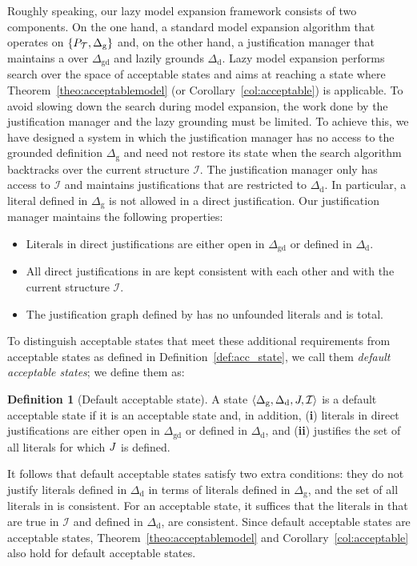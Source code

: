 \documentclass[11pt]{article}
\newcommand{\m}[1]{\ensuremath{#1}\xspace}
\newcommand{\I}{\m{\mathcal{I}}}
\newcommand{\theory}{\m{\mathcal{T}}}
\newcommand{\D}{\m{\Delta}}
\newcommand{\tuple}[1]{\m{\left \langle #1 \right \rangle }}
\theoremstyle{plain}
\theoremstyle{definition}
\newtheorem{definition}[thm]{Definition}
\theoremstyle{example_basic}
\theoremstyle{example_contd}
\theoremstyle{plain}
\newcommand{\Dg}{\ensuremath{\D_\text{g}}\xspace}
\newcommand{\Dd}{\ensuremath{\D_\text{d}}\xspace}
\newcommand{\Dgd}{\ensuremath{\D_\text{gd}}\xspace}
\newcommand{\pt}{\ensuremath{P_\text{\theory}}\xspace}
\newcommand{\tbf}[1]{\textbf{#1}}
\newcommand{\change}[1]{#1}
\begin{document}
Roughly speaking, our lazy model expansion framework consists of two components. On the one hand, a standard model expansion algorithm that operates on $\{\pt, \Dg\}$ and, on the other hand, a justification manager that maintains a \justification over \Dgd and lazily grounds \Dd. Lazy model expansion performs search over the space of acceptable states and aims at reaching a state where Theorem~\ref{theo:acceptablemodel} (or Corollary~\ref{col:acceptable}) is applicable. To avoid slowing down the search during model expansion, the work done by the justification manager and the lazy grounding must be limited. To achieve this, we have designed a system in which the justification manager has no access to the grounded definition \Dg and need not restore its state when the search algorithm backtracks over the current structure \I.  The justification manager only has access to \I and maintains justifications that are restricted to \Dd. In particular, a literal defined in \Dg is not allowed in a direct justification. Our justification manager maintains the following properties: 
\begin{itemize}
\item Literals in direct justifications are either open in \Dgd or defined in \Dd.
\item All direct justifications in \jgraph are kept consistent with each other and with the current structure \I.
\item The justification graph defined by \jgraph has no \change{unfounded literals} and is total.
\end{itemize}

To distinguish acceptable states that meet these additional
requirements from acceptable states as defined in
Definition~\ref{def:acc_state}, we call them 
\emph{default acceptable states}; we define them as:

\begin{definition}[Default acceptable state]\label{def:default_acc_state}
A state $\tuple{\Dg,\Dd,\jgraph,\I}$ is a default acceptable state if it is an acceptable state and, in addition,
(\tbf{i}) literals in direct justifications are either open in \Dgd or defined in \Dd, and  (\tbf{ii}) \jgraph justifies the set of all literals for which $J$ is defined. \end{definition}
It follows that default acceptable states satisfy two extra conditions: they do not justify 
literals defined in \Dd in terms of literals defined in \Dg, and the set of all literals in \jgraph is consistent. \change{For an acceptable state, it suffices that the literals in \jgraph that are true in \I and defined in \Dd, are consistent.}
Since default acceptable states are acceptable states, Theorem~\ref{theo:acceptablemodel} and Corollary~\ref{col:acceptable} also hold for default acceptable states.
 
\end{document}
